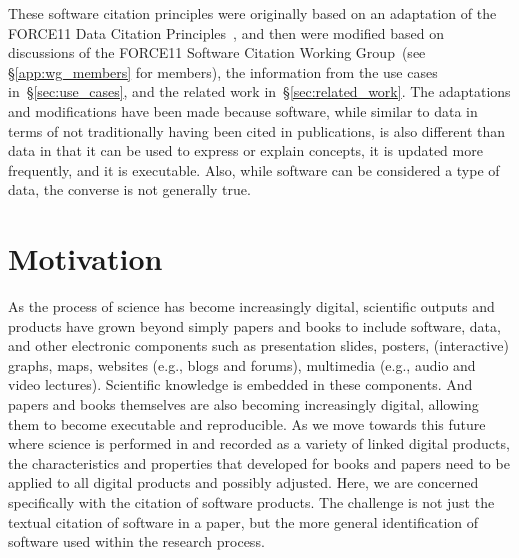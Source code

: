 \documentclass[11pt, oneside]{amsart}
\newcommand{\katznote}[1]{ {\textcolor{blue} { ***DSK: #1 }}} %
\begin{document}
These software citation principles were originally based on an adaptation of the
FORCE11 Data Citation Principles~\cite{data-citation-principles}, and then were
modified based on discussions of the FORCE11 Software Citation Working 
Group~(see \S\ref{app:wg_members} for members), the information from the use
cases in~\S\ref{sec:use_cases}, and the related work in~\S\ref{sec:related_work}. 
The adaptations and modifications have been made
because software, while similar to data in terms of not traditionally having
been cited in publications, is also different than data in that it can be used
to express or explain concepts, it is updated more frequently, and it is
executable.
Also, while software can be considered a type of data, the converse is not
generally true.




\section{Motivation}
\label{sec:intro}

As the process of science has become increasingly digital, scientific outputs
and products have grown beyond simply papers and books to include software,
data, and other electronic components such as presentation slides, posters, 
(interactive)  graphs, maps, websites (e.g., blogs and forums),  multimedia 
(e.g., audio and  video lectures).  Scientific knowledge is embedded in these
components. And papers and books themselves are also becoming increasingly
digital, allowing them to become executable and reproducible. As we move towards
this future where science is performed in and recorded as a variety of linked
digital products, the characteristics and properties that developed for books
and papers need to be applied to all digital products and possibly adjusted.
Here, we are concerned specifically with the citation of software products. The
challenge is not just the textual citation of software in a paper, but the more
general identification of software used within the research process.
\end{document}
